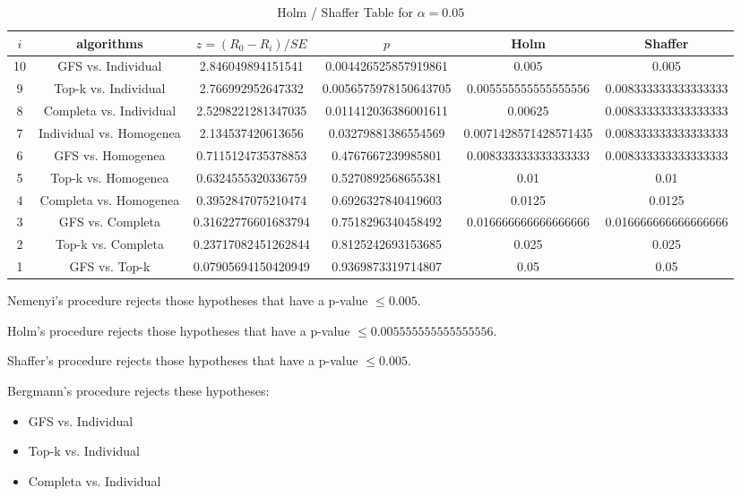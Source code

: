 \documentclass[a4paper,10pt]{article}
\begin{document}
\begin{landscape}
\begin{table}[!htp]
\centering\tiny
\caption{Holm / Shaffer Table for $\alpha=0.05$}
\begin{tabular}{cccccc}
$i$&algorithms&$z=(R_0 - R_i)/SE$&$p$&Holm&Shaffer\\
\hline
10&GFS vs. Individual&2.846049894151541&0.004426525857919861&0.005&0.005\\
9&Top-k vs. Individual&2.766992952647332&0.0056575978150643705&0.005555555555555556&0.008333333333333333\\
8&Completa vs. Individual&2.5298221281347035&0.011412036386001611&0.00625&0.008333333333333333\\
7&Individual vs. Homogenea&2.134537420613656&0.03279881386554569&0.0071428571428571435&0.008333333333333333\\
6&GFS vs. Homogenea&0.7115124735378853&0.4767667239985801&0.008333333333333333&0.008333333333333333\\
5&Top-k vs. Homogenea&0.6324555320336759&0.5270892568655381&0.01&0.01\\
4&Completa vs. Homogenea&0.3952847075210474&0.6926327840419603&0.0125&0.0125\\
3&GFS vs. Completa&0.31622776601683794&0.7518296340458492&0.016666666666666666&0.016666666666666666\\
2&Top-k vs. Completa&0.23717082451262844&0.8125242693153685&0.025&0.025\\
1&GFS vs. Top-k&0.07905694150420949&0.9369873319714807&0.05&0.05\\
\hline
\end{tabular}
\end{table}
Nemenyi's procedure rejects those hypotheses that have a p-value $\le0.005$.


Holm's procedure rejects those hypotheses that have a p-value $\le0.005555555555555556$.


Shaffer's procedure rejects those hypotheses that have a p-value $\le0.005$.


Bergmann's procedure rejects these hypotheses:


\begin{itemize}


\item GFS vs. Individual
\item Top-k vs. Individual
\item Completa vs. Individual
\end{itemize}



\end{landscape}
\end{document}
